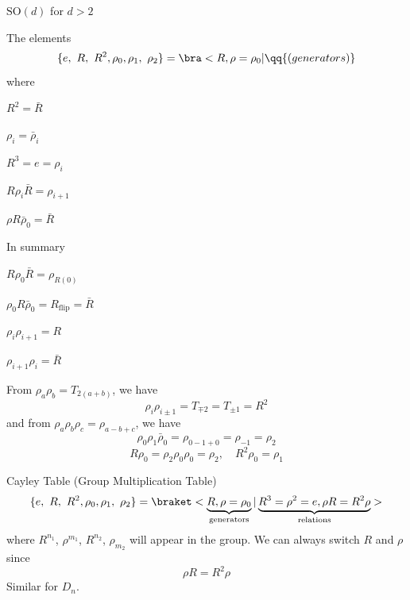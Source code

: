 \begin{example}
  $\text{SO}(d)$ for $d > 2$
\end{example}
\begin{example}
  The elements
  \[
    \{e,\ R,\ R^2, \rho_0, \rho_1,\ \rho_2\} = \bra<R,\rho = \rho_0|
    \qq{(generators)}
  \]
  where
  \begin{enumext}[columns = 2]
    \item $R^2 = \bar R$
    \item $\rho_i = \bar\rho_i$
    \item $R^3 = e = \rho_i$
    \item $R\rho_i\bar R = \rho_{i+1}$
    \item $\rho R \bar\rho_0 = \bar R$
  \end{enumext}
  In summary
  \begin{enumext}[columns = 2]
    \item $R\rho_0\bar R = \rho_{R(0)}$
    \item $\rho_0 R\bar\rho_0 = R_\text{flip} = \bar R$
    \item $\rho_i\rho_{i+1} = R$
    \item $\rho_{i+1}\rho_i = \bar R$
  \end{enumext}
  From $\rho_a\rho_b = T_{2(a+b)}$, we have
  \[
    \rho_i \rho_{i\pm 1} = T_{\mp2} = T_{\pm 1} = R^2
  \]
  and from $\rho_a\rho_b\rho_c = \rho_{a-b+c}$, we have
  \[
    \rho_0\rho_1\bar\rho_0 = \rho_{0-1+0} = \rho_{-1} = \rho_2
  \]
  \[
    R\rho_0 = \rho_2 \rho_0 \rho_0 = \rho_2, \quad
    R^2 \rho_0 = \rho_1
  \]
\end{example}
Cayley Table (Group Multiplication Table)
\[
  \{e,\ R,\ R^2, \rho_0, \rho_1,\ \rho_2\}
= \braket<\underbrace{R,\rho = \rho_0}_\text{generators}|
  \underbrace{R^3 = \rho^2 = e, \rho R = R^2\rho}_\text{relations}>
\]
where $R^{n_1}$, $\rho^{m_1}$, $R^{n_2}$, $\rho_{m_2}$
will appear in the group. We can always switch $R$ and $\rho$ since
\[
  \rho R = R^2 \rho
\]
Similar for $D_n$.

